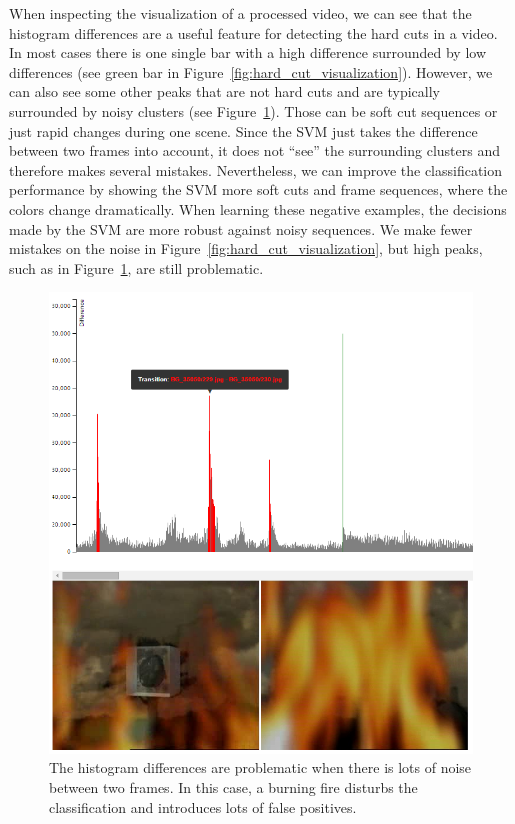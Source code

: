 When inspecting the visualization of a processed video, we can see that the histogram differences are a useful feature for detecting the hard cuts in a video.
In most cases there is one single bar with a high difference surrounded by low differences (see green bar in Figure~\ref{fig:hard_cut_visualization}).
However, we can also see some other peaks that are not hard cuts and are typically surrounded by noisy clusters (see Figure~\ref{fig:hard_cut_noise_visualization}).
Those can be soft cut sequences or just rapid changes during one scene.
Since the SVM just takes the difference between two frames into account, it does not ``see'' the surrounding clusters and therefore makes several mistakes.
Nevertheless, we can improve the classification performance by showing the SVM more soft cuts and frame sequences, where the colors change dramatically.
When learning these negative examples, the decisions made by the SVM are more robust against noisy sequences.
We make fewer mistakes on the noise in Figure~\ref{fig:hard_cut_visualization}, but high peaks, such as in Figure~\ref{fig:hard_cut_noise_visualization}, are still problematic.

\begin{figure}
	\centering
	\includegraphics[scale=.7]{images/hard_cut_noise_visualization.png}
	\caption{The histogram differences are problematic when there is lots of noise between two frames. In this case, a burning fire disturbs the classification and introduces lots of false positives.}
	\label{fig:hard_cut_noise_visualization}
\end{figure}
